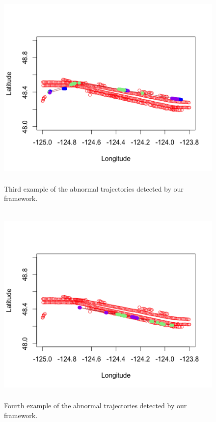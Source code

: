 \documentclass[12pt,glossary]{dalcsthesis}
\begin{document}
\begin{figure}[!hp]
\centering
\includegraphics[width=4.7in, height=4in]{p3.png}
\caption{Third example of the abnormal trajectories detected by our framework.}
\label{fig:anomalydetection_tra3}
\end{figure}

\begin{figure}[!hp]
\centering
\includegraphics[width=4.7in, height=4in]{p4.png}
\caption{Fourth example of the abnormal trajectories detected by our framework.}
\label{fig:anomalydetection_tra4}
\end{figure}
\end{document}
